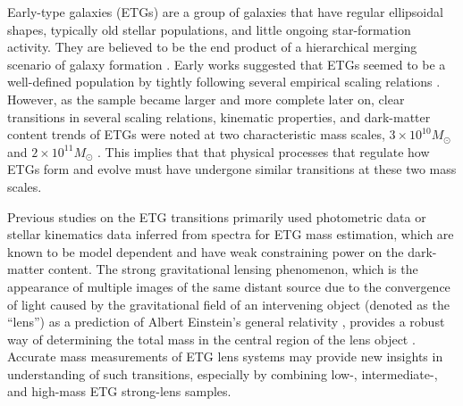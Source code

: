 \documentclass{emulateapj}
\begin{document}
Early-type galaxies (ETGs) are a group of galaxies that have regular ellipsoidal shapes, 
typically old stellar populations, and little ongoing star-formation activity. They are 
believed to be the end product of a hierarchical merging scenario of galaxy formation 
\citep[e.g.,][]{TT72, White91, Kauffmann93, Cole2000}. Early works suggested that ETGs 
seemed to be a well-defined population by tightly following several empirical scaling relations 
\citep[e.g.,][]{Faber76, Kormendy77, Dressler87, Djorgovski87}. However, as the sample became 
larger and more complete later on, clear transitions in several scaling relations, 
kinematic properties, and dark-matter content trends of ETGs were noted at two 
characteristic mass scales, $3 \times 10^{10} M_{\odot}$ and $2 \times 10^{11} M_{\odot}$ 
\citep[e.g.,][]{Tremblay96, Graham03a, Kauffmann03, Graham08, Hyde09, Skelton09, Tortora09, 
vanderWel09, Bernardi11a, Bernardi11b, Cappellari13a, Cappellari13, Montero16}. 
This implies that that physical processes that regulate how ETGs form and evolve must have 
undergone similar transitions at these two mass scales. 

Previous studies on the ETG transitions primarily used photometric data or stellar kinematics 
data inferred from spectra for ETG mass estimation, which are known to be model dependent and 
have weak constraining power on the dark-matter content. 
The strong gravitational lensing phenomenon, which is the appearance of multiple images of the 
same distant source due to the convergence of light caused by the gravitational field of an 
intervening object (denoted as the ``lens'') as a prediction of Albert Einstein's general 
relativity \citep[GR;][]{Einstein16}, provides a robust way of determining 
the total mass in the central region of the lens object \citep[e.g., see a review article by][]{Treu10}. 
Accurate mass measurements of ETG lens systems may provide new 
insights in understanding of such transitions, especially by combining low-, intermediate-, 
and  high-mass ETG strong-lens samples. 
\end{document}
